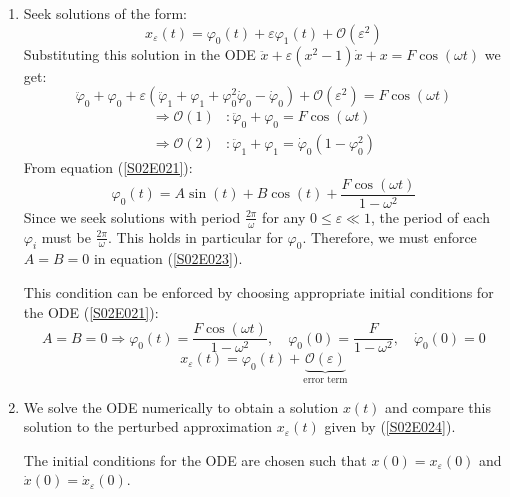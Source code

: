 \documentclass[twoside,10pt,a4paper]{article}
\begin{document}
\begin{enumerate}[label=(\roman*)]
\item Seek solutions of the form:
\begin{equation*}
	x_\varepsilon(t)=\varphi_0(t)+ \varepsilon\varphi_1(t) + \mathcal{O}(\varepsilon^2)
\end{equation*}
Substituting this solution in the ODE $\ddot{x} + \varepsilon(x^2-1)\dot{x} + x = F\cos(\omega t)$ we get:
\begin{equation*}
	\ddot{\varphi}_0 + \varphi_0 + \varepsilon(\ddot{\varphi}_1 + \varphi_1 + \varphi_0^2\dot{\varphi}_0 - \dot{\varphi}_0) + \mathcal{O}(\varepsilon^2) = F\cos(\omega t)
\end{equation*}
\begin{align}
	\Longrightarrow \mathcal{O}(1) &: \ddot{\varphi}_0 + \varphi_0 = F\cos(\omega t) \label{S02E021} \\
	\Longrightarrow \mathcal{O}(2) &: \ddot{\varphi}_1 + \varphi_1 = \dot{\varphi}_0(1-\varphi_0^2) \label{S02E022}
\end{align}
From equation (\ref{S02E021}):
\begin{equation}
	\varphi_0(t) = A\sin(t) + B\cos(t) + \frac{F\cos(\omega t)}{1-\omega^2} \label{S02E023}
\end{equation}
Since we seek solutions with period $\frac{2\pi}{\omega}$ for any $0\leq \varepsilon \ll 1$, the period of each $\varphi_i$ must be $\frac{2\pi}{\omega}$. This holds in particular for $\varphi_0$. Therefore, we must enforce $A=B=0$ in equation (\ref{S02E023}).

This condition can be enforced by choosing appropriate initial conditions for the ODE (\ref{S02E021}):
\begin{equation}\label{S02E024}
	A=B=0 \Longrightarrow \boxed{\varphi_0(t) = \frac{F\cos(\omega t)}{1-\omega^2}, \quad \varphi_0(0) = \frac{F}{1-\omega^2}, \quad \dot{\varphi}_0(0)=0}
\end{equation}
\begin{equation*}
	x_\varepsilon(t) = \varphi_0(t) + \underbrace{\mathcal{O}(\varepsilon)}_\text{error term}
\end{equation*}


\item We solve the ODE numerically to obtain a solution $x(t)$ and compare this solution to the perturbed approximation $x_\varepsilon(t)$ given by (\ref{S02E024}).

The initial conditions for the ODE are chosen such that $x(0) = x_\varepsilon(0)$ and $\dot{x}(0) = \dot{x}_\varepsilon(0)$.


\end{enumerate}
\end{document}
